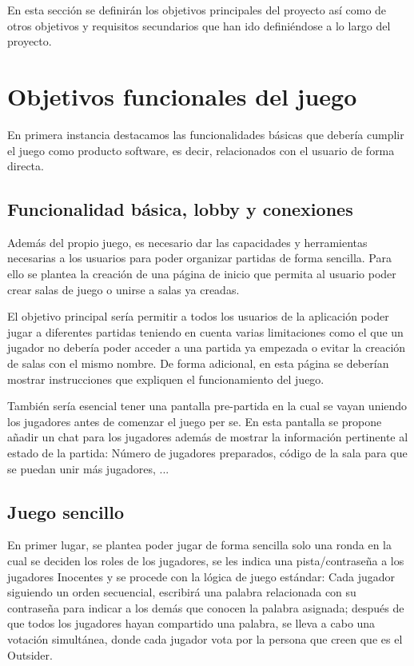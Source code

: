 En esta sección se definirán los objetivos principales del proyecto así como de otros objetivos y
requisitos secundarios que han ido definiéndose a lo largo del proyecto.

\section{Objetivos funcionales del juego}

En primera instancia destacamos las funcionalidades básicas que debería cumplir el juego como
producto software, es decir, relacionados con el usuario de forma directa.

\subsection{Funcionalidad básica, lobby y conexiones}

Además del propio juego, es necesario dar las capacidades y herramientas necesarias a los usuarios para
poder organizar partidas de forma sencilla. Para ello se plantea la creación de una página de inicio que
permita al usuario poder crear salas de juego o unirse a salas ya creadas.

El objetivo principal sería permitir a todos los usuarios de la aplicación poder jugar a
diferentes partidas teniendo en cuenta varias limitaciones como el que un jugador no debería poder acceder
a una partida ya empezada o evitar la creación de salas con el mismo nombre. De forma adicional, en esta página se deberían mostrar instrucciones que expliquen el funcionamiento
del juego.

También sería esencial tener una pantalla pre-partida en la cual se vayan uniendo los jugadores
antes de comenzar el juego per se. En esta pantalla se propone añadir un chat para los jugadores además
de mostrar la información pertinente al estado de la partida: Número de jugadores preparados, código de la
sala para que se puedan unir más jugadores, ...

\subsection{Juego sencillo}

En primer lugar, se plantea poder jugar de forma sencilla solo una ronda en la cual se deciden los
roles de los jugadores, se les indica una pista/contraseña a los jugadores Inocentes y se procede con la lógica
de juego estándar: Cada jugador siguiendo un orden secuencial, escribirá una palabra relacionada con su contraseña
para indicar a los demás que conocen la palabra asignada; después de que todos los jugadores hayan compartido una
palabra, se lleva a cabo una votación simultánea, donde cada jugador vota por la persona que creen
que es el Outsider.

